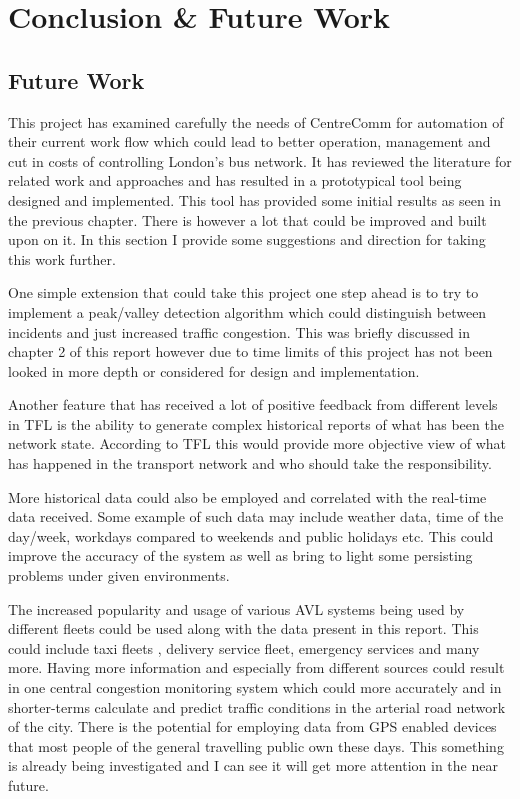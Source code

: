 \chapter{Conclusion \& Future Work}

\section{Future Work}
This project has examined carefully the needs of CentreComm for automation of their current work flow which could lead to better operation, management and cut in costs of controlling London's bus network. It has reviewed the literature for related work and approaches and has resulted in a prototypical tool being designed and implemented. This tool has provided some initial results as seen in the previous chapter. There is however a lot that could be improved and built upon on it. In this section I provide some suggestions and direction for taking this work further.

One simple extension that could take this project one step ahead is to try to implement a peak/valley detection algorithm which could distinguish between incidents and just increased traffic congestion. This was briefly discussed in chapter 2 of this report however due to time limits of this project has not been looked in more depth or considered for design and implementation.

Another feature that has received a lot of positive feedback from different levels in TFL is the ability to generate complex historical reports of what has been the network state. According to TFL this would provide more objective view of what has happened in the transport network and who should take the responsibility. 

More historical data could also be employed and correlated with the real-time data received.  Some example of such data may include weather data, time of the day/week, workdays compared to weekends and public holidays etc. This could improve the accuracy of the system as well as bring to light some persisting problems under given environments.

The increased popularity and usage of various AVL systems being used by different fleets could be used along with the data present in this report. This could include taxi fleets \cite{rahmani2010requirements}, delivery service fleet, emergency services and many more. Having more information and especially from different sources could result in one central congestion monitoring system which could more accurately and in shorter-terms calculate and predict traffic conditions in the arterial road network of the city. There is the potential for employing data from GPS enabled devices that most people of the general travelling public own these days. This something is already being investigated \cite{thiagarajan2010cooperative} and I can see it will get more attention in the near future.

